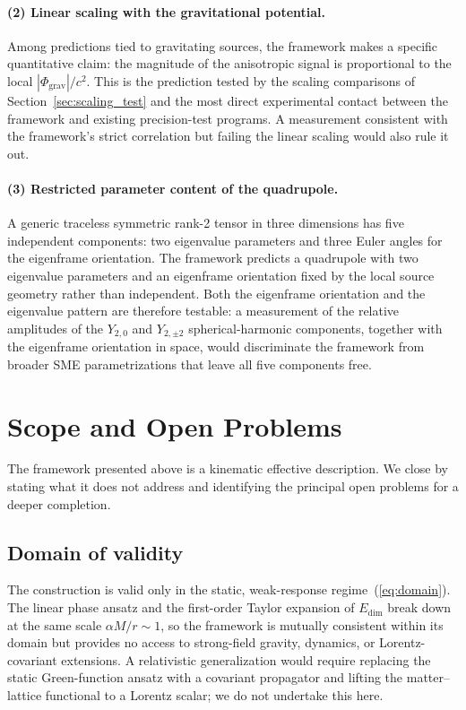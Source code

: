\documentclass[a4paper,fleqn]{cas-dc}
\theoremstyle{thmstyleone}%
\theoremstyle{thmstyletwo}%
\begin{document}
\paragraph{(2) Linear scaling with the gravitational potential.}
Among predictions tied to gravitating sources, the framework
makes a specific quantitative claim: the magnitude of the
anisotropic signal is proportional to the local
$|\Phi_{\mathrm{grav}}|/c^2$. This is the prediction tested by
the scaling comparisons of Section~\ref{sec:scaling_test} and
the most direct experimental contact between the framework
and existing precision-test programs. A measurement consistent
with the framework's strict correlation but failing the linear
scaling would also rule it out.

\paragraph{(3) Restricted parameter content of the quadrupole.}
A generic traceless symmetric rank-2 tensor in three
dimensions has five independent components: two eigenvalue
parameters and three Euler angles for the eigenframe
orientation. The framework predicts a quadrupole with two
eigenvalue parameters and an eigenframe orientation fixed by
the local source geometry rather than independent. Both the
eigenframe orientation and the eigenvalue pattern are
therefore testable: a measurement of the relative amplitudes
of the $Y_{2,0}$ and $Y_{2,\pm 2}$ spherical-harmonic
components, together with the eigenframe orientation in space,
would discriminate the framework from broader SME
parametrizations that leave all five components free.


\section{Scope and Open Problems}
\label{sec:scope}

The framework presented above is a kinematic effective
description. We close by stating what it does not address and
identifying the principal open problems for a deeper
completion.

\subsection{Domain of validity}

The construction is valid only in the static, weak-response
regime~(\ref{eq:domain}). The linear phase ansatz and the
first-order Taylor expansion of $E_{\mathrm{dim}}$ break down
at the same scale $\alpha M/r\sim 1$, so the framework is
mutually consistent within its domain but provides no access
to strong-field gravity, dynamics, or Lorentz-covariant
extensions. A relativistic generalization would require
replacing the static Green-function ansatz with a covariant
propagator and lifting the matter--lattice functional to a
Lorentz scalar; we do not undertake this here.
\end{document}
